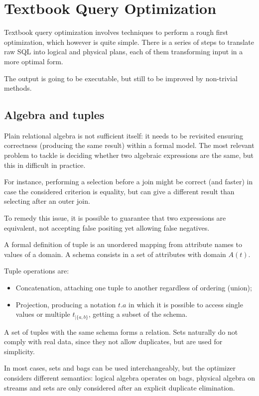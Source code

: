 
\section{Textbook Query Optimization}
Textbook query optimization involves techniques to perform a rough first optimization, which however is quite simple. There is a series of steps to translate raw SQL into logical and physical plans, each of them transforming input in a more optimal form.

The output is going to be executable, but still to be improved by non-trivial methods.

\subsection{Algebra and tuples}
Plain relational algebra is not sufficient itself: it needs to be revisited ensuring correctness (producing the same result) within a formal model. The most relevant problem to tackle is deciding whether two algebraic expressions are the same, but this in difficult in practice.

For instance, performing a selection before a join might be correct (and faster) in case the considered criterion is equality, but can give a different result than selecting after an outer join. 

To remedy this issue, it is possible to guarantee that two expressions are equivalent, not accepting false positing yet allowing false negatives. 

A formal definition of tuple is an unordered mapping from attribute names to values of a domain. A schema consists in a set of attributes with domain $A(t)$.

Tuple operations are:
\begin{itemize}
	\item Concatenation, attaching one tuple to another regardless of ordering (union);
	\item Projection, producing a notation $t.a$ in which it is possible to access single values or multiple $t_{|\{a, b\}}$, getting a subset of the schema.
\end{itemize}

A set of tuples with the same schema forms a relation. Sets naturally do not comply with real data, since they not allow duplicates, but are used for simplicity.

In most cases, sets and bags can be used interchangeably, but the optimizer considers different semantics: logical algebra operates on bags, physical algebra on streams and sets are only considered after an explicit duplicate elimination.

